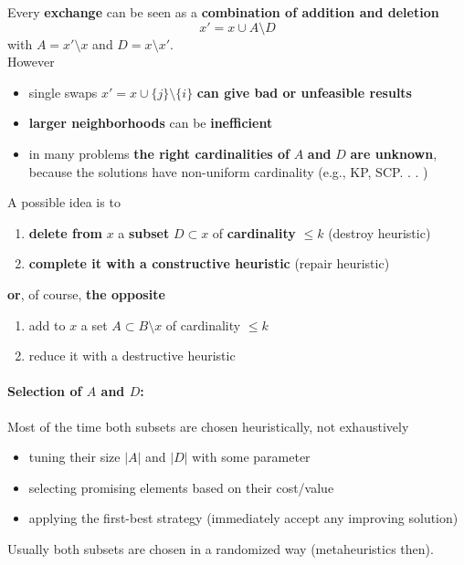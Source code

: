 Every \textbf{exchange} can be seen as a \textbf{combination of addition and deletion}
$$ x' = x \cup A \setminus D $$
with $A = x' \setminus x$ and $D = x \setminus x'$.\\

However
\begin{itemize}
	\item single swaps $x' = x \cup \{j\} \setminus \{i\}$ \textbf{can give bad or unfeasible results}
	
	\item \textbf{larger neighborhoods} can be \textbf{inefficient}
	
	\item in many problems \textbf{the right cardinalities of} $A$ \textbf{and} $D$ \textbf{are unknown}, because the solutions have non-uniform cardinality (e.g., KP, SCP. . . )
\end{itemize}

A possible idea is to
\begin{enumerate}
	\item \textbf{delete from} $x$ a \textbf{subset} $D \subset x$ of \textbf{cardinality} $\leq k$ (destroy heuristic)
	\item \textbf{complete it with a constructive heuristic} (repair heuristic)
\end{enumerate}

\textbf{or}, of course, \textbf{the opposite}
\begin{enumerate}
	\item add to $x$ a set $A \subset B \setminus x$ of cardinality $\leq k$
	\item reduce it with a destructive heuristic
\end{enumerate}

\paragraph{Selection of $A$ and $D$:} Most of the time both subsets are chosen heuristically, not exhaustively
\begin{itemize}
	\item tuning their size $|A|$ and $|D|$ with some parameter
	
	\item selecting promising elements based on their cost/value
	
	\item applying the first-best strategy (immediately accept any improving solution)
\end{itemize}

Usually both subsets are chosen in a randomized way (metaheuristics then). \\


\newpage